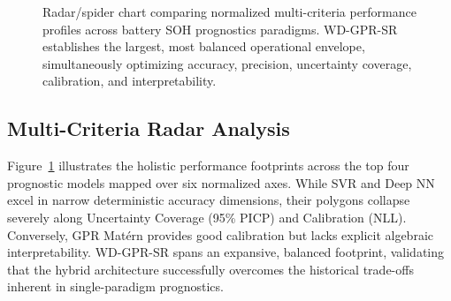 \documentclass[a4paper,fleqn]{cas-sc}
\begin{document}
\begin{figure}[pos=htbp]
\caption{Radar/spider chart comparing normalized multi-criteria performance profiles across battery SOH prognostics paradigms. WD-GPR-SR establishes the largest, most balanced operational envelope, simultaneously optimizing accuracy, precision, uncertainty coverage, calibration, and interpretability.}
\label{fig:spider_chart}
\end{figure}

\subsection{Multi-Criteria Radar Analysis}
Figure~\ref{fig:spider_chart} illustrates the holistic performance footprints across the top four prognostic models mapped over six normalized axes. While SVR and Deep NN excel in narrow deterministic accuracy dimensions, their polygons collapse severely along Uncertainty Coverage (95\% PICP) and Calibration (NLL). Conversely, GPR Matérn provides good calibration but lacks explicit algebraic interpretability. WD-GPR-SR spans an expansive, balanced footprint, validating that the hybrid architecture successfully overcomes the historical trade-offs inherent in single-paradigm prognostics.
\end{document}
